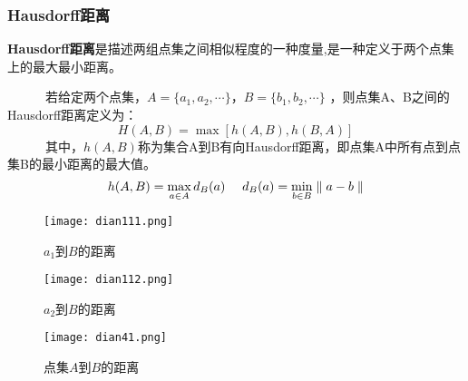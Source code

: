 \documentclass[notheorems,mathserif,table,compress]{beamer}  %
\begin{document}
\begin{frame}
\frametitle{Hausdorff距离}
   {\color{blue}\textbf{Hausdorff距离}}是描述两组点集之间相似程度的一种度量,是一种定义于两个点集上的最大最小距离。

~~~~~~若给定两个点集，$A=\{a_{1},a_{2},\cdots\}$，$B=\{b_{1},b_{2},\cdots\}$ ，则点集A、B之间的Hausdorff距离定义为：
\begin{displaymath}
H(A,B)=\max[h(A,B),h(B,A)]
\end{displaymath}
~~~~~~其中，$h(A,B)$称为集合A到B有向Hausdorff距离，即点集A中所有点到点集B的最小距离的最大值。
\begin{displaymath}
h(A,B)=\max_{\begin{subarray}{l}
              a\in A
               \end{subarray}}
       d_{B}(a)
~~~~
d_{B}(a)=\min_{\begin{subarray}{l}
              b\in B
               \end{subarray}}
        \parallel a-b \parallel
\end{displaymath}
\end{frame}



\begin{frame}

   \begin{figure}[!ht]
    \begin{minipage}{0.4\textwidth}
    \centering
    \texttt{[image: dian111.png]}
    \caption{$a_{1}$到$B$的距离}
    \end{minipage}
    \begin{minipage}{0.4\textwidth}
    \centering
    \texttt{[image: dian112.png]}
    \caption{$a_{2}$到$B$的距离}
    \end{minipage}
   \end{figure}
\end{frame}

\begin{frame}
   \begin{figure}[!ht]
    \centering
    \texttt{[image: dian41.png]}
    \caption{点集$A$到$B$的距离}
   \end{figure}
\end{frame}
\end{document}
